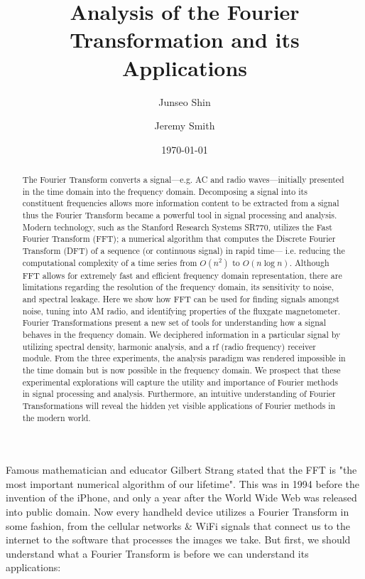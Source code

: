 \documentclass[prl,twocolumn,superscriptaddress,floatfix]{revtex4}
\begin{document}
\title{Analysis of the Fourier Transformation and its Applications}
\author{Junseo Shin}
\author{Jeremy Smith}

\date{\today}

\begin{abstract}
The Fourier Transform converts a signal---e.g. AC and radio waves---initially presented in the time domain into the frequency domain.
Decomposing a signal into its constituent frequencies allows more information content to be extracted from a signal 
thus the Fourier Transform became a powerful tool in signal processing and analysis.
Modern technology, such as the Stanford Research Systems SR770, utilizes the Fast Fourier Transform (FFT);
a numerical algorithm that computes the Discrete Fourier Transform (DFT) of a sequence (or continuous signal) in rapid time--- i.e. reducing the computational complexity of a time series from $O(n^2)$ to $O(n \log n)$\cite{FFT}.
Although FFT allows for extremely fast and efficient frequency domain representation, there are limitations regarding the resolution of the frequency domain,
its sensitivity to noise, and spectral leakage. 
Here we show how FFT can be used for finding signals amongst noise, tuning into AM radio, and identifying properties of the fluxgate magnetometer. 
Fourier Transformations present a new set of tools for understanding how a signal behaves in the frequency domain.
We deciphered information in a particular signal by utilizing spectral density, harmonic analysis, and a rf (radio frequency) receiver module. 
From the three experiments, the analysis paradigm was rendered impossible in the time domain but is now possible in the frequency domain.
We prospect that these experimental explorations will capture the utility and importance of Fourier methods in signal processing and analysis.
Furthermore, an intuitive understanding of Fourier Transformations will reveal the hidden yet visible applications of Fourier methods in the modern world. 
\end{abstract}
\maketitle

Famous mathematician and educator Gilbert Strang stated that the FFT is "the most important numerical algorithm of our lifetime"\cite{strang}.
This was in 1994 before the invention of the iPhone, and only a year after the World Wide Web was released into public domain\cite{cernweb}.
Now every handheld device utilizes a Fourier Transform in some fashion, from the cellular networks \& WiFi signals that connect us to the internet to the software that processes the images we take. But first, we should understand what a Fourier Transform is before we can understand its applications:
\end{document}
